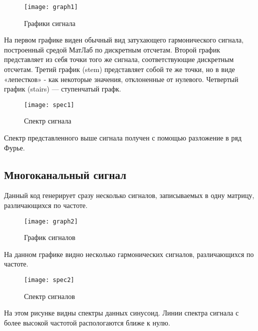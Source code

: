 \begin{figure}[H]
	\begin{center}
		\texttt{[image: graph1]}
		\caption{Графики сигнала} 
		\label{pic:graph1} %
	\end{center}
\end{figure}
На первом графике виден обычный вид затухающего гармонического сигнала, построенный средой МатЛаб по дискретным отсчетам. Второй график представляет из себя точки того же сигнала, соответствующие дискретным отсчетам. Третий график (stem) представляет собой те же точки, но в виде «лепестков» - как некоторые значения, отклоненные от нулевого. Четвертый график (stairs) — ступенчатый графк.

\begin{figure}[H]
	\begin{center}
		\texttt{[image: spec1]}
		\caption{Спектр сигнала} 
		\label{pic:spec1} %
	\end{center}
\end{figure}
Спектр представленного выше сигнала получен с помощью разложение в ряд Фурье.

\subsection{Многоканальный сигнал}


\parindent=1cm
Данный код генерирует сразу несколько сигналов, записываемых в одну матрицу, различающихся по частоте.

\begin{figure}[H]
	\begin{center}
		\texttt{[image: graph2]}
		\caption{График сигналов} 
		\label{pic:graph2} %
	\end{center}
\end{figure}
На данном графике видно несколько гармонических сигналов, различающихся по частоте.

\begin{figure}[H]
	\begin{center}
		\texttt{[image: spec2]}
		\caption{Спектр сигналов} 
		\label{pic:spech2} %
	\end{center}
\end{figure}
На этом рисунке видны спектры данных синусоид. Линии спектра сигнала с более высокой частотой распологаются ближе к нулю.

